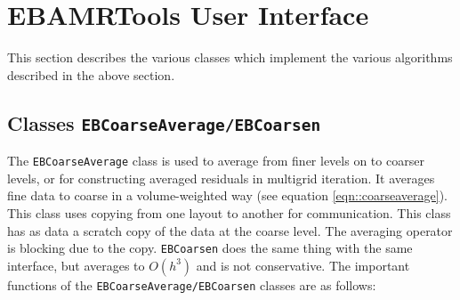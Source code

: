 \section{EBAMRTools User Interface}

This section describes the various classes which implement 
the various algorithms described in the above section.

\subsection{Classes {\tt EBCoarseAverage/EBCoarsen}}

The {\tt EBCoarseAverage} class  is used to average
from finer levels on to coarser levels, or for constructing averaged
residuals in multigrid iteration.  It averages fine data
to coarse in a volume-weighted way (see equation 
\ref{eqn::coarseaverage}). 
This class uses copying from
one layout to another for communication.  This class has
as data a scratch copy of the data at the coarse level.
The averaging operator is blocking due to the copy.
 {\tt EBCoarsen} does the same thing
with the same interface, but averages to $O(h^3) $ and is not conservative.
The important functions of the {\tt EBCoarseAverage/EBCoarsen} classes
are as follows:
